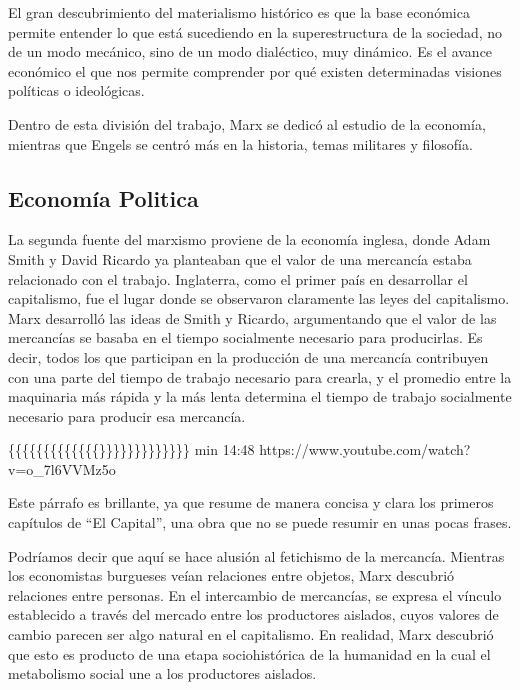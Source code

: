 \documentclass[
  jou,
  floatsintext,
  longtable,
  a4paper,
  nolmodern,
  notxfonts,
  notimes,
  colorlinks=true,linkcolor=blue,citecolor=blue,urlcolor=blue]{apa7}
\begin{document}
El gran descubrimiento del materialismo histórico es que la base
económica permite entender lo que está sucediendo en la superestructura
de la sociedad, no de un modo mecánico, sino de un modo dialéctico, muy
dinámico. Es el avance económico el que nos permite comprender por qué
existen determinadas visiones políticas o ideológicas.

Dentro de esta división del trabajo, Marx se dedicó al estudio de la
economía, mientras que Engels se centró más en la historia, temas
militares y filosofía.

\subsection{Economía Politica}\label{economuxeda-politica}

La segunda fuente del marxismo proviene de la economía inglesa, donde
Adam Smith y David Ricardo ya planteaban que el valor de una mercancía
estaba relacionado con el trabajo. Inglaterra, como el primer país en
desarrollar el capitalismo, fue el lugar donde se observaron claramente
las leyes del capitalismo. Marx desarrolló las ideas de Smith y Ricardo,
argumentando que el valor de las mercancías se basaba en el tiempo
socialmente necesario para producirlas. Es decir, todos los que
participan en la producción de una mercancía contribuyen con una parte
del tiempo de trabajo necesario para crearla, y el promedio entre la
maquinaria más rápida y la más lenta determina el tiempo de trabajo
socialmente necesario para producir esa mercancía.

\{\{\{\{\{\{\{\{\{\{\{\{\{\}\}\}\}\}\}\}\}\}\}\}\}\} min 14:48
https://www.youtube.com/watch?v=o\_7l6VVMz5o

Este párrafo es brillante, ya que resume de manera concisa y clara los
primeros capítulos de ``El Capital'', una obra que no se puede resumir
en unas pocas frases.

Podríamos decir que aquí se hace alusión al fetichismo de la mercancía.
Mientras los economistas burgueses veían relaciones entre objetos, Marx
descubrió relaciones entre personas. En el intercambio de mercancías, se
expresa el vínculo establecido a través del mercado entre los
productores aislados, cuyos valores de cambio parecen ser algo natural
en el capitalismo. En realidad, Marx descubrió que esto es producto de
una etapa sociohistórica de la humanidad en la cual el metabolismo
social une a los productores aislados.
\end{document}
